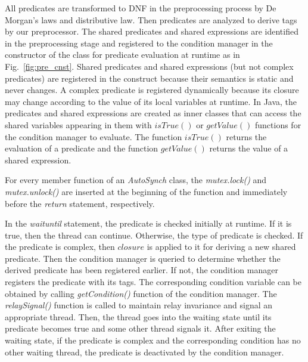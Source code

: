 \documentclass{sigplanconf}
\begin{document}
All predicates are transformed to DNF in the preprocessing process by De 
Morgan's laws and distributive law. Then predicates are analyzed to derive 
tags by our preprocessor. The shared predicates and shared 
expressions are identified in the preprocessing stage and registered to the 
condition manager in the constructor of the class for predicate evaluation at
runtime as in Fig.~\ref{fig:pre_cnst}. 
Shared predicates and shared expressions (but not complex predicates) are
registered in the construct because their semantics is static and never changes. A complex 
predicate is registered dynamically because its closure may change according to 
the value of its local variables at runtime. In Java, the predicates and shared expressions are 
created as inner classes that can access the shared variables appearing in them 
with $isTrue()$ or $getValue()$ functions for the condition manager to evaluate.
The function $isTrue()$ returns the evaluation of a predicate and
the function $getValue()$ returns the value of a shared expression.


For every member function of an {\em AutoSynch} class, the {\em mutex.lock()} and
{\em mutex.unlock()} are inserted at the beginning of the function and 
immediately before the {\em return} statement, respectively.
%  


In the {\em waituntil} statement, the predicate is checked initially at
runtime. 
If it is true, then the thread can continue. Otherwise, the type of
predicate is checked. If the predicate is complex, then $closure$ 
is applied to it for deriving a new shared predicate. Then the condition manager 
is queried to determine
whether the derived predicate has been registered earlier. If not, the
condition manager registers the 
predicate with its tags. The corresponding 
condition variable can be obtained by calling {\em getCondition()} function of the
condition manager. The {\em relaySignal()} function is called to maintain relay invariance 
and signal an appropriate thread. Then, the thread goes into the waiting state 
until its predicate becomes true and some other thread signals it. After 
exiting the waiting state, if the 
predicate is complex and the corresponding condition has no other 
waiting thread, the predicate is deactivated by the condition manager.
\end{document}
